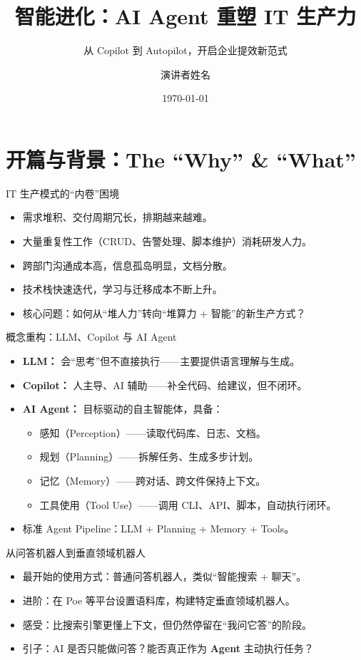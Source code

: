 \documentclass[aspectratio=169]{beamer}
\title{智能进化：AI Agent 重塑 IT 生产力}
\subtitle{从 Copilot 到 Autopilot，开启企业提效新范式}
\author{演讲者姓名}
\institute{部门名称}
\date{\today}
\begin{document}
\begin{frame}
  \titlepage
\end{frame}

\section{开篇与背景：The ``Why'' \& ``What''}

\begin{frame}{IT 生产模式的“内卷”困境}
  \begin{itemize}
    \item 需求堆积、交付周期冗长，排期越来越难。
    \item 大量重复性工作（CRUD、告警处理、脚本维护）消耗研发人力。
    \item 跨部门沟通成本高，信息孤岛明显，文档分散。
    \item 技术栈快速迭代，学习与迁移成本不断上升。
    \item 核心问题：如何从“堆人力”转向“堆算力 + 智能”的新生产方式？
  \end{itemize}
\end{frame}

\begin{frame}{概念重构：LLM、Copilot 与 AI Agent}
  \begin{itemize}
    \item \textbf{LLM：} 会“思考”但不直接执行——主要提供语言理解与生成。
    \item \textbf{Copilot：} 人主导、AI 辅助——补全代码、给建议，但不闭环。
    \item \textbf{AI Agent：} 目标驱动的自主智能体，具备：
      \begin{itemize}
        \item 感知（Perception）——读取代码库、日志、文档。
        \item 规划（Planning）——拆解任务、生成多步计划。
        \item 记忆（Memory）——跨对话、跨文件保持上下文。
        \item 工具使用（Tool Use）——调用 CLI、API、脚本，自动执行闭环。
      \end{itemize}
    \item 标准 Agent Pipeline：LLM + Planning + Memory + Tools。
  \end{itemize}
\end{frame}

\begin{frame}{从问答机器人到垂直领域机器人}
  \begin{itemize}
    \item 最开始的使用方式：普通问答机器人，类似“智能搜索 + 聊天”。
    \item 进阶：在 Poe 等平台设置语料库，构建特定垂直领域机器人。
    \item 感受：比搜索引擎更懂上下文，但仍然停留在“我问它答”的阶段。
    \item 引子：AI 是否只能做问答？能否真正作为 \textbf{Agent} 主动执行任务？
  \end{itemize}
\end{frame}
\end{document}
